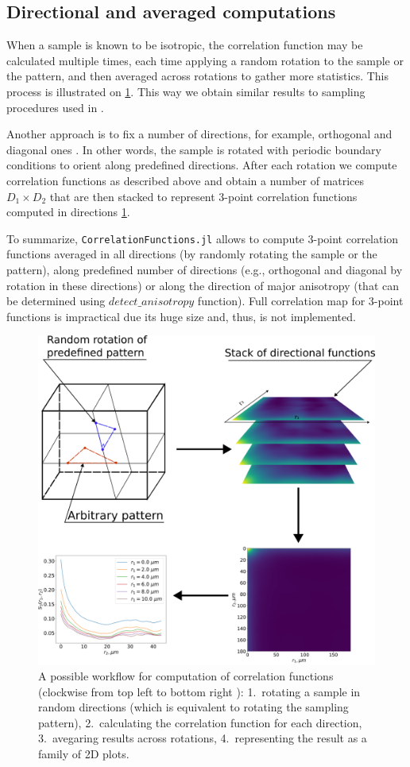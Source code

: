 \documentclass[reprint,amsmath,amssymb,aps,pre,showkeys,showpacs]{revtex4-1}
\newcommand{\code}[1]{\colorbox{light-gray}{\texttt{#1}}}
\begin{document}
\subsection{Directional and averaged computations}
When a sample is known to be isotropic, the correlation function may be
calculated multiple times, each time applying a random rotation to the sample or
the pattern, and then averaged across rotations to gather more statistics. This
process is illustrated on \cref{fig:workflow}. This way we obtain similar
results to sampling procedures used in
\cite{berryman1988,SMITH1988176,malmir2018}.

Another approach is to fix a number of directions, for example, orthogonal and
diagonal ones \cite{EPL1,EPL2,CFsjlpaper}. In other words, the sample is rotated
with periodic boundary conditions to orient along predefined directions. After
each rotation we compute correlation functions as described above and obtain a
number of matrices $D_1 \times D_2$ that are then stacked to represent 3-point
correlation functions computed in directions \cref{fig:workflow}.

To summarize, \code{CorrelationFunctions.jl} allows to compute 3-point
correlation functions averaged in all directions (by randomly rotating the
sample or the pattern), along predefined number of directions (e.g., orthogonal
and diagonal by rotation in these directions) or along the direction of major
anisotropy (that can be determined using \code{$detect\_anisotropy$} function).
Full correlation map for 3-point functions is impractical due its huge size and,
thus, is not implemented.

\begin{figure}[tp]
  \centering
  \includegraphics[width=0.6\linewidth]{images/workflow.png}
  \caption[]{A possible workflow for computation of correlation functions
    (clockwise from top left to bottom right ): 1.~rotating a sample in random
    directions (which is equivalent to rotating the sampling pattern),
    2.~calculating the correlation function for each direction, 3.~avegaring
    results across rotations, 4.~representing the result as a family of 2D
    plots.}
  \label{fig:workflow}
\end{figure}
\end{document}

